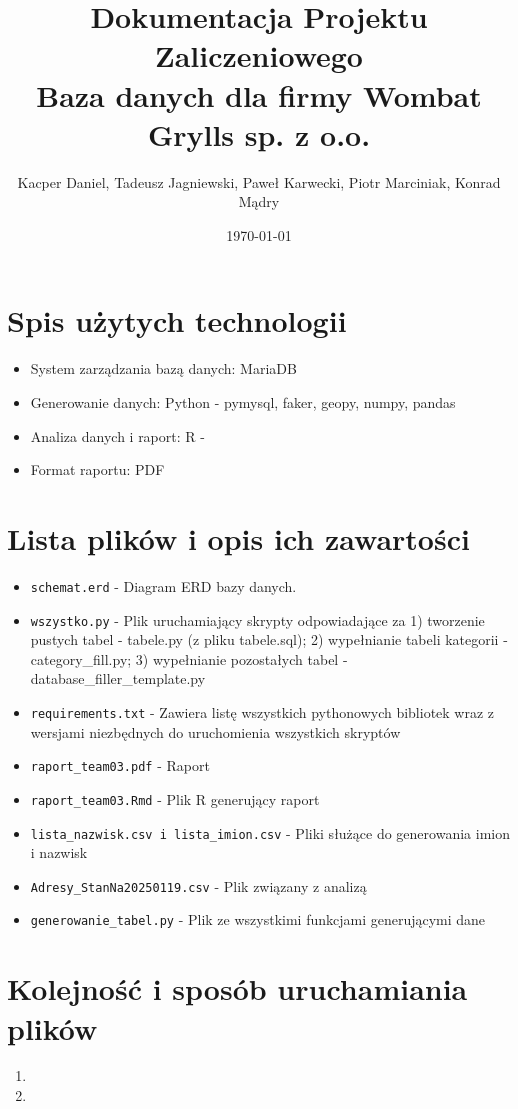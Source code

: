 \documentclass{article}
\title{Dokumentacja Projektu Zaliczeniowego\\ \huge Baza danych dla firmy Wombat Grylls sp. z o.o.}
\author{Kacper Daniel, Tadeusz Jagniewski, Paweł Karwecki, Piotr Marciniak, Konrad Mądry}
\date{\today}
\begin{document}
\maketitle

\newpage

\tableofcontents
\newpage

\section{Spis użytych technologii}
\begin{itemize}
    \item System zarządzania bazą danych: MariaDB
    \item Generowanie danych: Python - pymysql, faker, geopy, numpy, pandas
    \item Analiza danych i raport: R - 
    \item Format raportu: PDF
\end{itemize}

\section{Lista plików i opis ich zawartości}
\begin{itemize}
    \item \texttt{schemat.erd} - Diagram ERD bazy danych.
    \item \texttt{wszystko.py} - Plik uruchamiający skrypty odpowiadające za 1) tworzenie pustych tabel - tabele.py (z pliku tabele.sql); 2) wypełnianie tabeli kategorii - category\_fill.py; 3) wypełnianie pozostałych tabel - \\database\_filler\_template.py
    \item \texttt{requirements.txt} - Zawiera listę wszystkich pythonowych bibliotek wraz z wersjami niezbędnych do uruchomienia wszystkich skryptów
    \item \texttt{raport\_team03.pdf} - Raport
    \item \texttt{raport\_team03.Rmd} - Plik R generujący raport
    \item \texttt{lista\_nazwisk.csv i lista\_imion.csv} - Pliki służące do generowania imion i nazwisk 
    \item \texttt{Adresy\_StanNa20250119.csv} - Plik związany z analizą
    \item \texttt{generowanie\_tabel.py} - Plik ze wszystkimi funkcjami generującymi dane
\end{itemize}

\section{Kolejność i sposób uruchamiania plików}
\begin{enumerate}
    \item \texttt{}
    \item \texttt{}
\end{enumerate}
\end{document}
